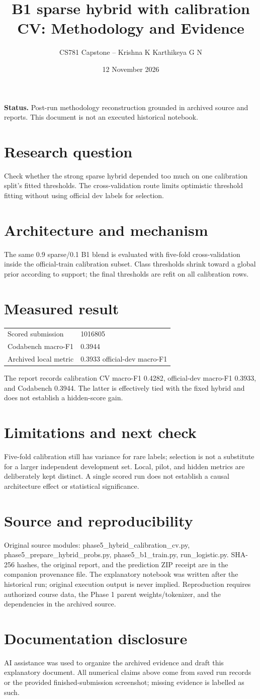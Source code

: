 \documentclass[11pt,a4paper]{article}
\title{B1 sparse hybrid with calibration CV: Methodology and Evidence}
\author{CS781 Capstone -- Krishna K Karthikeya G N}
\date{12 November 2026}
\begin{document}
\maketitle
\noindent\textbf{Status.} Post-run methodology reconstruction grounded in archived source and reports. This document is not an executed historical notebook.\par
\section*{Research question}
Check whether the strong sparse hybrid depended too much on one calibration split's fitted thresholds. The cross-validation route limits optimistic threshold fitting without using official dev labels for selection.
\section*{Architecture and mechanism}
The same 0.9 sparse/0.1 B1 blend is evaluated with five-fold cross-validation inside the official-train calibration subset. Class thresholds shrink toward a global prior according to support; the final thresholds are refit on all calibration rows.
\section*{Measured result}
\begin{center}\begin{tabular}{ll}Scored submission & 1016805\\
Codabench macro-F1 & 0.3944\\
Archived local metric & 0.3933 official-dev macro-F1\end{tabular}\end{center}
The report records calibration CV macro-F1 0.4282, official-dev macro-F1 0.3933, and Codabench 0.3944. The latter is effectively tied with the fixed hybrid and does not establish a hidden-score gain.
\section*{Limitations and next check}
Five-fold calibration still has variance for rare labels; selection is not a substitute for a larger independent development set. Local, pilot, and hidden metrics are deliberately kept distinct. A single scored run does not establish a causal architecture effect or statistical significance.
\section*{Source and reproducibility}
Original source modules: phase5\_hybrid\_calibration\_cv.py, phase5\_prepare\_hybrid\_probs.py, phase5\_b1\_train.py, run\_logistic.py. SHA-256 hashes, the original report, and the prediction ZIP receipt are in the companion provenance file. The explanatory notebook was written after the historical run; original execution output is never implied. Reproduction requires authorized course data, the Phase 1 parent weights/tokenizer, and the dependencies in the archived source.
\section*{Documentation disclosure}
AI assistance was used to organize the archived evidence and draft this explanatory document. All numerical claims above come from saved run records or the provided finished-submission screenshot; missing evidence is labelled as such.
\end{document}
